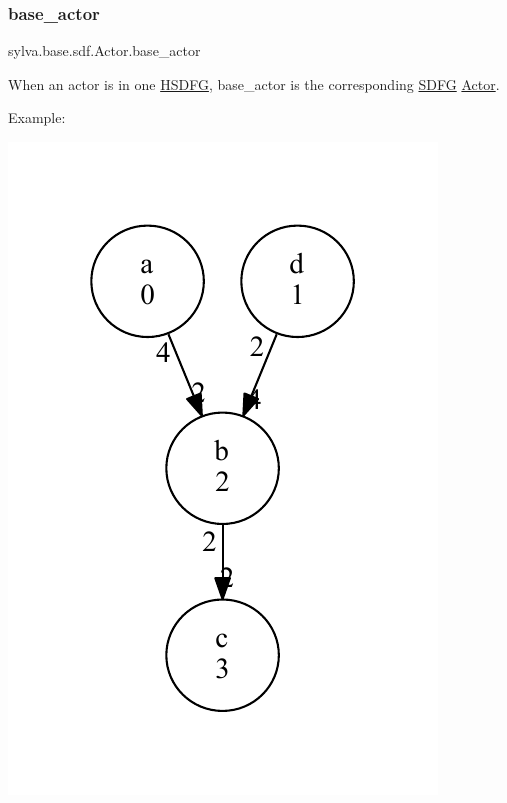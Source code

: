 \mbox{\label{classsylva_1_1base_1_1sdf_1_1_actor_ac5ef898588204ab1eb4a8ac68fa5fd71}} 
\subsubsection{\texorpdfstring{base\+\_\+actor}{base\_actor}}
{\footnotesize\ttfamily sylva.\+base.\+sdf.\+Actor.\+base\+\_\+actor}



When an actor is in one \hyperlink{classsylva_1_1base_1_1sdf_1_1_h_s_d_f_g}{H\+S\+D\+FG}, {\ttfamily base\+\_\+actor} is the corresponding \hyperlink{classsylva_1_1base_1_1sdf_1_1_s_d_f_g}{S\+D\+FG} \hyperlink{classsylva_1_1base_1_1sdf_1_1_actor}{Actor}. 

Example\+: 
\begin{DoxyImage}
\includegraphics[width=\textwidth,height=\textheight/2,keepaspectratio=true]{dot_SDFG_example}
\end{DoxyImage}
 
